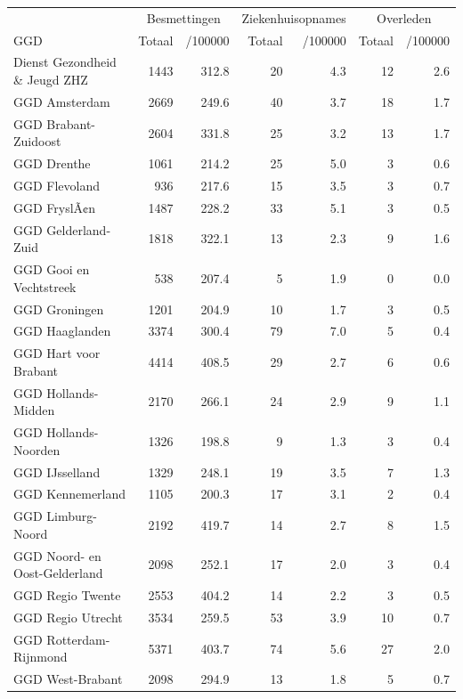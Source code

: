 \documentclass[
  english,
  man,floatsintext]{apa6}
\begin{document}
\begin{table}
\centering\begingroup\fontsize{10}{12}\selectfont

\begin{threeparttable}
\begin{tabular}{lrrrrrr}
\toprule
\multicolumn{1}{c}{ } & \multicolumn{2}{c}{Besmettingen} & \multicolumn{2}{c}{Ziekenhuisopnames} & \multicolumn{2}{c}{Overleden} \\
\cmidrule(l{3pt}r{3pt}){2-3} \cmidrule(l{3pt}r{3pt}){4-5} \cmidrule(l{3pt}r{3pt}){6-7}
GGD & Totaal & /100000 & Totaal & /100000 & Totaal & /100000\\
\midrule
Dienst Gezondheid \& Jeugd ZHZ & 1443 & 312.8 & 20 & 4.3 & 12 & 2.6\\
GGD Amsterdam & 2669 & 249.6 & 40 & 3.7 & 18 & 1.7\\
GGD Brabant-Zuidoost & 2604 & 331.8 & 25 & 3.2 & 13 & 1.7\\
GGD Drenthe & 1061 & 214.2 & 25 & 5.0 & 3 & 0.6\\
GGD Flevoland & 936 & 217.6 & 15 & 3.5 & 3 & 0.7\\
GGD FryslÃ¢n & 1487 & 228.2 & 33 & 5.1 & 3 & 0.5\\
GGD Gelderland-Zuid & 1818 & 322.1 & 13 & 2.3 & 9 & 1.6\\
GGD Gooi en Vechtstreek & 538 & 207.4 & 5 & 1.9 & 0 & 0.0\\
GGD Groningen & 1201 & 204.9 & 10 & 1.7 & 3 & 0.5\\
GGD Haaglanden & 3374 & 300.4 & 79 & 7.0 & 5 & 0.4\\
GGD Hart voor Brabant & 4414 & 408.5 & 29 & 2.7 & 6 & 0.6\\
GGD Hollands-Midden & 2170 & 266.1 & 24 & 2.9 & 9 & 1.1\\
GGD Hollands-Noorden & 1326 & 198.8 & 9 & 1.3 & 3 & 0.4\\
GGD IJsselland & 1329 & 248.1 & 19 & 3.5 & 7 & 1.3\\
GGD Kennemerland & 1105 & 200.3 & 17 & 3.1 & 2 & 0.4\\
GGD Limburg-Noord & 2192 & 419.7 & 14 & 2.7 & 8 & 1.5\\
GGD Noord- en Oost-Gelderland & 2098 & 252.1 & 17 & 2.0 & 3 & 0.4\\
GGD Regio Twente & 2553 & 404.2 & 14 & 2.2 & 3 & 0.5\\
GGD Regio Utrecht & 3534 & 259.5 & 53 & 3.9 & 10 & 0.7\\
GGD Rotterdam-Rijnmond & 5371 & 403.7 & 74 & 5.6 & 27 & 2.0\\
GGD West-Brabant & 2098 & 294.9 & 13 & 1.8 & 5 & 0.7\\

\end{tabular}
\end{threeparttable}
\end{table}
\end{document}
